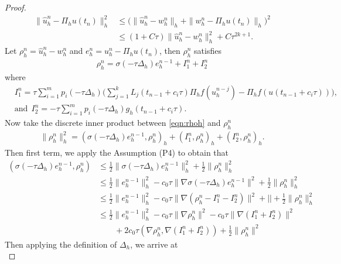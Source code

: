 \documentclass[10pt,final,leqno,onefignum,onetabnum]{siamltex}%
\begin{document}
\begin{proof}
\begin{equation}\label{eqn:split}
\begin{split}
\| \hat u_h^n - \Pi_h u(t_n)  \|_h^2 &\le \Big(\| \hat u_h^n - w_h^n \|_h + \|w_h^n - \Pi_h u(t_n)   \|_h \Big)^2 \\
&\le (1+C\tau) \| \hat u_h^n - w_h^n \|_h^2 + C\tau^{2k+1}.
\end{split}
\end{equation}
Let $\rho_h^n = \hat u_h^n  - w_h^n $ and $e_h^n = u_h^n - \Pi_h u(t_n)$, then $\rho_h^n$ satisfies
\begin{align}\label{eqn:rhoh}
\rho_h^n = \sigma(-\tau \Delta_h) e_h^{n-1} + I_1^n + I_2^n
\end{align}
where
\begin{align*}
&  I_1^n = \tau \sum_{i=1}^m p_i(-\tau \Delta_h) \Big(
\sum_{j=1}^{k} L_j (t_{n-1} + c_i\tau) \Pi_h f(u_h^{n-j}) - \Pi_h f(u(t_{n-1}+c_i\tau)) \Big) ,\\
& \text{and}~~
I_2^n = - \tau \sum_{i=1}^m p_i(-\tau \Delta_h) g_h(t_{n-1}+c_i\tau).
\end{align*}
Now take the discrete inner product between \eqref{eqn:rhoh} and $\rho_h^n$
\begin{align*}
 \| \rho_h^n \|_h^2 = (\sigma(-\tau \Delta_h) e_h^{n-1}, \rho_h^n)_h + (I_1^n,\rho_h^n)_h + (I_2^n,\rho_h^n)_h.
\end{align*}
Then first term, we apply the Assumption (P4) to obtain that
\begin{align*}
(\sigma(-\tau \Delta_h) e_h^{n-1}, \rho_h^n) &\le \frac12\|  \sigma(-\tau \Delta_h) e_h^{n-1} \|_h^2 + \frac12\| \rho_h^n\|_h^2 \\
&\le \frac12\|  e_h^{n-1} \|_h^2 - c_0\tau \| \nabla \sigma(-\tau \Delta_h) e_h^{n-1} \|^2 + \frac12\| \rho_h^n\|_h^2\\
&\le \frac12\|  e_h^{n-1} \|_h^2 - c_0\tau \| \nabla (\rho_h^n - I_1^n - I_2^n) \|^2 + |  |+ \frac12\| \rho_h^n\|_h^2\\
&\le \frac12\|  e_h^{n-1} \|_h^2 - c_0\tau \| \nabla \rho_h^n\|^2 - c_0\tau \| \nabla(I_1^n +I_2^n) \|^2\\
&\qquad+2c_0 \tau (\nabla \rho_h^n,\nabla (I_1^n +I_2^n))+ \frac12\| \rho_h^n\|^2
\end{align*}
Then applying the definition of $\Delta_h$, we arrive at
\begin{equation}\label{eqn:rhoh-3}

\end{equation}
\end{proof}
\end{document}
